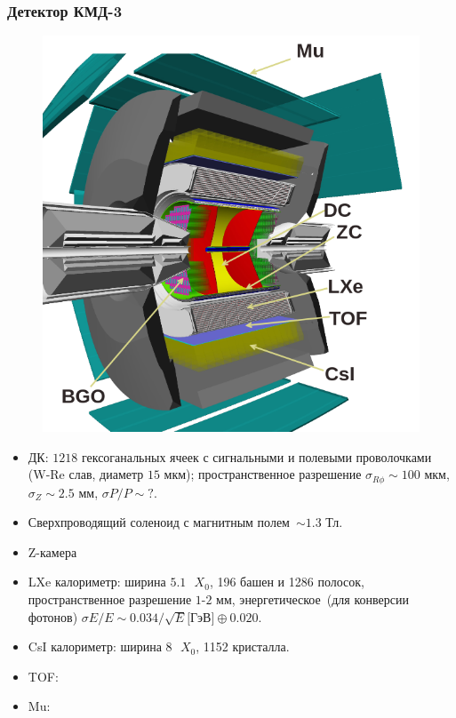 \documentclass{beamer}
\begin{document}
\begin{frame}
  \frametitle{Детектор КМД-3}
  \begin{minipage}[t]{0.4\linewidth}
    \begin{figure}
      \includegraphics[width=\linewidth]{figures/cmd3.png}
    \end{figure}
  \end{minipage}
  \begin{minipage}[t]{0.55\linewidth}
    \scriptsize
    \begin{itemize}
    \item ДК: $1218$ гексоганальных ячеек с сигнальными и полевыми проволочками
      (W-Re слав, диаметр $15\text{ мкм}$); пространственное разрешение
      $\sigma_{R\phi}\sim{100}\text{ мкм}$, $\sigma_{Z}\sim{2.5}\text{ мм}$, $\sigma{P}/P\sim{?}$.
    \item Сверхпроводящий соленоид с магнитным полем~$\sim{1.3}\text{ Тл}$.
    \item Z-камера
    \item LXe калориметр: ширина $5.1\text{ }X_0$, 196 башен и 1286 полосок,
      пространственное разрешение $1$-$2\text{ мм}$, энергетическое~(для
      конверсии фотонов) $\sigma{E}/E\sim 0.034/\sqrt{E}\text{[ГэВ]}\oplus{0.020}$.
    \item CsI калориметр: ширина $8\text{ }X_0$, 1152 кристалла.
    \item TOF:
    \item Mu:
    \end{itemize}
  \end{minipage}
\end{frame}
\end{document}
